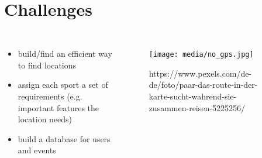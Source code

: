\documentclass[aspectratio=169]{beamer}
\begin{document}






\section{Challenges}
\begin{frame}
\begin{columns}
	\begin{itemize}
		\item build/find an efficient way to find locations
		\item assign each sport a set of requirements (e.g. important features the location needs)
		\item build a database for users and events
	\end{itemize}
	 \begin{figure}
		 \centering
		\texttt{[image: media/no\_gps.jpg]}
		\caption{https://www.pexels.com/de-de/foto/paar-das-route-in-der-karte-sucht-wahrend-sie-zusammen-reisen-5225256/}
	\end{figure}
\end{columns}
\end{frame}
\end{document}

